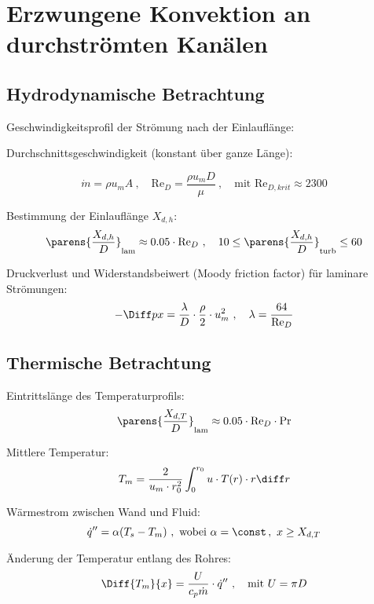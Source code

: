 
\section{Erzwungene Konvektion an durchströmten Kanälen} %
	\subsection{Hydrodynamische Betrachtung} %
		Geschwindigkeitsprofil der Strömung nach der Einlauflänge:

		Durchschnittsgeschwindigkeit (konstant über ganze Länge):

		\[
			\dot{m} = \rho u_m A
			\ ,\quad
			\mathrm{Re}_D = \frac{\rho u_m D}{\mu}
			\ ,\quad
			\text{mit } \mathrm{Re}_{D,krit} \approx 2300
		\]

		Bestimmung der Einlauflänge $X_{d,h}$:
		\[
			\parens{\frac{X_{d,h}}{D}}_\text{lam} \approx 0.05 \cdot \mathrm{Re}_D
			\ ,\quad
			10 \leq \parens{\frac{X_{d,h}}{D}}_\text{turb} \leq 60
		\]

		Druckverlust und Widerstandsbeiwert (Moody friction factor) für laminare Strömungen:
		\[
			-\Diff p x = \frac \lambda D \cdot \frac \rho 2 \cdot u_m^2
			\ ,\quad
			\lambda = \frac{64}{\mathrm{Re}_D}
		\]
	
	\subsection{Thermische Betrachtung} %
		Eintrittslänge des Temperaturprofils:
		\[
			\parens{\frac{X_{d,T}}{D}}_\text{lam} \approx 0.05 \cdot \mathrm{Re}_D \cdot \mathrm{Pr}
		\]

		Mittlere Temperatur:
		\[
			T_m = \frac{2}{u_m \cdot r_0^2} \int_0^{r_0} u \cdot T(r) \cdot r \diff r
		\]

		Wärmestrom zwischen Wand und Fluid:
		\[
			\dot{q}'' = \alpha (T_s - T_m)
			\ ,\ \text{wobei } \alpha = \const\,, \ x \geq X_{d,T}
		\]

		Änderung der Temperatur entlang des Rohres:
		\[
			\Diff{T_m}{x} = \frac{U}{c_p \dot m} \cdot \dot{q}''
			\ ,\quad \text{mit } U = \pi D
		\]

